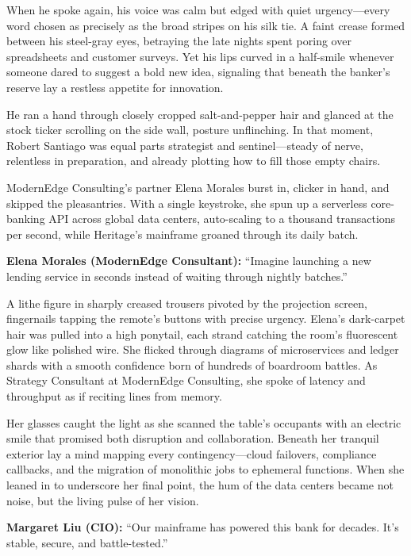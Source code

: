 When he spoke again, his voice was calm but edged with quiet urgency—every word  
chosen as precisely as the broad stripes on his silk tie. A faint crease formed  
between his steel-gray eyes, betraying the late nights spent poring over  
spreadsheets and customer surveys. Yet his lips curved in a half-smile whenever  
someone dared to suggest a bold new idea, signaling that beneath the banker’s  
reserve lay a restless appetite for innovation.

He ran a hand through closely cropped salt-and-pepper hair and glanced at the  
stock ticker scrolling on the side wall, posture unflinching. In that moment,  
Robert Santiago was equal parts strategist and sentinel—steady of nerve,  
relentless in preparation, and already plotting how to fill those empty chairs.

ModernEdge Consulting’s partner Elena Morales burst in, clicker in hand, and  
skipped the pleasantries. With a single keystroke, she spun up a serverless  
core-banking API across global data centers, auto-scaling to a thousand  
transactions per second, while Heritage’s mainframe groaned through its daily  
batch.

\textbf{Elena Morales (ModernEdge Consultant):} “Imagine launching a new lending  
service in seconds instead of waiting through nightly batches.”

A lithe figure in sharply creased trousers pivoted by the projection  
screen, fingernails tapping the remote’s buttons with precise urgency.  
Elena’s dark-carpet hair was pulled into a high ponytail, each strand  
catching the room’s fluorescent glow like polished wire. She flicked through  
diagrams of microservices and ledger shards with a smooth confidence born of  
hundreds of boardroom battles. As Strategy Consultant at ModernEdge Consulting,  
she spoke of latency and throughput as if reciting lines from memory.

Her glasses caught the light as she scanned the table’s occupants with an  
electric smile that promised both disruption and collaboration. Beneath her  
tranquil exterior lay a mind mapping every contingency—cloud failovers,  
compliance callbacks, and the migration of monolithic jobs to ephemeral  
functions. When she leaned in to underscore her final point, the hum of the  
data centers became not noise, but the living pulse of her vision.  

\textbf{Margaret Liu (CIO):} “Our mainframe has powered this bank for decades.  
It’s stable, secure, and battle-tested.”

